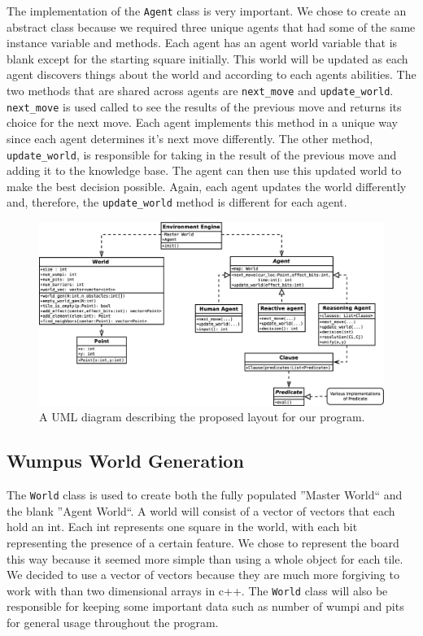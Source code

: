 \documentclass{article}
\begin{document}
		
		
	
		
		The implementation of the  \texttt{Agent} class is very important. 
		We chose to create an abstract class because we required three unique agents that had some of the same instance variable and methods. Each agent has an agent world variable that is blank except for the starting square initially. 
		This world will be updated as each agent discovers things about the world and according to each agents abilities. 
		The two methods that are shared across agents are \texttt{next\_move} and \texttt{update\_world}. 
		\texttt{next\_move} is used called to see the results of the previous move and returns its choice for the next move. 
		Each agent implements this method in a unique way since each agent determines it's next move differently. 
		The other method, \texttt{update\_world}, is responsible for taking in the result of the previous move and adding it to the knowledge base. 
		The agent can then use this updated world to make the best decision possible. 
		Again, each agent updates the world differently and, therefore, the \texttt{update\_world} method is different for each agent.
		
	
		   \begin{figure}[h!]
		   	\centering
		   	\includegraphics[width = 1\textwidth]{diagrams/uml_project2}
		   	\caption{A UML diagram describing the proposed layout for our program.}
		   	\label{uml}
		   \end{figure}
		
		\subsection{Wumpus World Generation}
		
			The \texttt{World} class is used to create both the fully populated ''Master World`` and the blank ''Agent World``. 
			A world will consist of a vector of vectors that each hold an int.
			Each int represents one square in the world, with each bit representing the presence of a certain feature. 
			We chose to represent the board this way because it seemed more simple than using a whole object for each tile.
			We decided to use a vector of vectors because they are much more forgiving to work with than two dimensional arrays in c++.
			The \texttt{World} class will also be responsible for keeping some important data such as number of wumpi and pits for general usage throughout the program.
		
\end{document}
